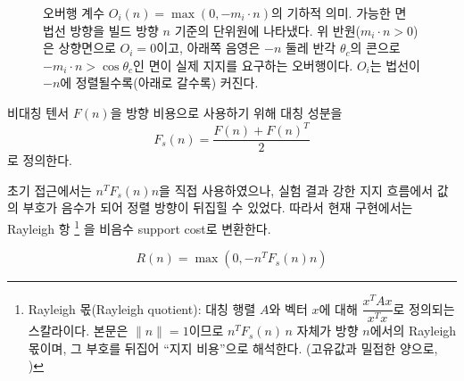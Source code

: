 \documentclass[11pt,a4paper]{article}
\begin{document}
\begin{figure}[H]
\centering
{}
\caption{오버행 계수 $O_i(n)=\max(0,-m_i\cdot n)$의 기하적 의미. 가능한 면 법선 방향을
빌드 방향 $n$ 기준의 단위원에 나타냈다. 위 반원($m_i\cdot n>0$)은 상향면으로 $O_i=0$이고,
아래쪽 음영은 $-n$ 둘레 반각 $\theta_c$의 콘으로 $-m_i\cdot n>\cos\theta_c$인 면이 실제 지지를
요구하는 오버행이다. $O_i$는 법선이 $-n$에 정렬될수록(아래로 갈수록) 커진다.}
\label{fig:overhang-coeff}
\end{figure}

비대칭 텐서 $F(n)$을 방향 비용으로 사용하기 위해 대칭 성분을
\begin{equation}
F_s(n)=\frac{F(n)+F(n)^T}{2}
\end{equation}
로 정의한다.

초기 접근에서는 $n^TF_s(n)n$을 직접 사용하였으나,
실험 결과 강한 지지 흐름에서 값의 부호가 음수가 되어 정렬 방향이 뒤집힐 수 있었다.
따라서 현재 구현에서는 Rayleigh 항%
\footnote{Rayleigh 몫(Rayleigh quotient): 대칭 행렬 $A$와 벡터 $x$에 대해 $\dfrac{x^TAx}{x^Tx}$로
정의되는 스칼라이다. 본문은 $\|n\|=1$이므로 $n^TF_s(n)\,n$ 자체가 방향 $n$에서의 Rayleigh 몫이며,
그 부호를 뒤집어 ``지지 비용''으로 해석한다. (고유값과 밀접한 양으로, \cite{hornjohnson})}
을 비음수 support cost로 변환한다.

\begin{equation}
R(n)=\max\left(0,-n^TF_s(n)n\right)
\end{equation}
\end{document}
